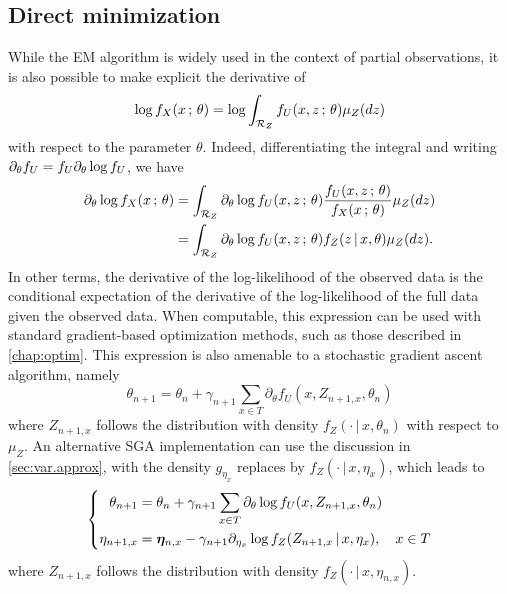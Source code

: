 \subsection{Direct minimization}
\label{sec:direct.min.incomplete}
While the EM algorithm is widely used in the context of partial observations, it is also possible to make explicit the derivative of 
\[
\log f_X(x\,;\,\theta) = \log \int_{{\mathcal R}_Z} f_U(x, z\,;\,\theta) \mu_Z(dz)
\]
with respect to the parameter $\theta$. Indeed, differentiating the integral and writing $\partial_\theta f_U = f_U \partial_\theta \log f_U$, we have
\begin{align*}
\partial_\theta \log f_X(x\,;\,\theta) &= \int_{{\mathcal R}_Z} \partial_\theta \log f_U(x, z\,;\,\theta) \frac{f_U(x, z\,;\,\theta)}{f_X(x\,;\,\theta)}  \mu_Z(dz) \\
&= \int_{{\mathcal R}_Z} \partial_\theta \log f_U(x, z\,;\,\theta) f_Z(z\,|\,x, \theta)  \mu_Z(dz).
\end{align*}
In other terms, the derivative of the log-likelihood of the observed data is the conditional expectation of the derivative of the log-likelihood of the full data given the observed data. When computable, this expression can be used with standard gradient-based optimization methods, such as those described in \cref{chap:optim}. This expression is also amenable to a stochastic gradient ascent algorithm, namely
\begin{equation}
\label{eq:direct.min.incomplete}
\theta_{n+1} = \theta_n + \gamma_{n+1} \sum_{x\in T} \partial_\theta f_U(x, Z_{n+1, x}, \theta_n)
\end{equation}
where $Z_{n+1, x}$ follows the distribution with density $f_Z(\cdot\,|\,x, \theta_n)$ with respect to $\mu_Z$. An alternative SGA implementation can use the discussion in \cref{sec:var.approx}, with the density $g_{\eta_x}$ replaces by $f_Z(\cdot\,|\,x, \eta_x)$, which leads to 
\[
\left\{
\begin{aligned}
\theta_{n+1} &= \theta_n + \gamma_{n+1} \sum_{x\in T} \partial_\theta \log f_U(x, Z_{n+1, x}, \theta_n)\\
\eta_{n+1,x} &= {\bm{\eta}}_{n,x} - \gamma_{n+1} \partial_{\eta_x} \log f_Z(Z_{n+1,x}\,|\,x, \eta_x), \quad x\in T
\end{aligned}
\right.
\]
where $Z_{n+1, x}$ follows the distribution with density $f_Z(\cdot\,|\,x, \eta_{n,x})$.


